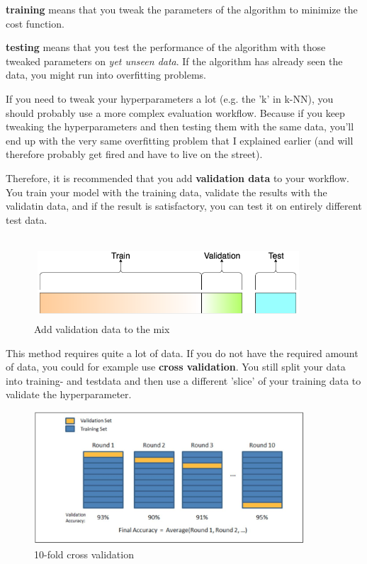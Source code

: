 \documentclass[a4paper, 11pt]{article}
\begin{document}
\textbf{training} means that you tweak the parameters of the algorithm to minimize the cost function.

\textbf{testing} means that you test the performance of the algorithm with those tweaked parameters on \textit{yet unseen data}. If the algorithm has already seen the data, you might run into overfitting problems.

\vspace{10px}

If you need to tweak your hyperparameters a lot (e.g. the 'k' in k-NN), you should probably use a more complex evaluation workflow. Because if you keep tweaking the hyperparameters and then testing them with the same data, you'll end up with the very same overfitting problem that I explained earlier (and will therefore probably get fired and have to live on the street).

\vspace{10px}

Therefore, it is recommended that you add \textbf{validation data} to your workflow. You train your model with the training data, validate the results with the validatin data, and if the result is satisfactory, you can test it on entirely different test data.

\begin{figure}[htb!]
    \centering
    \includegraphics[keepaspectratio=true,width=0.9\textwidth]{validation_data.png}
    \caption{Add validation data to the mix}
    \label{fig:validation_data}
\end{figure}

This method requires quite a lot of data. If you do not have the required amount of data, you could for example use \textbf{cross validation}. You still split your data into training- and testdata and then use a different 'slice' of your training data to validate the hyperparameter.

\begin{figure}[htb!]
    \centering
    \includegraphics[keepaspectratio=true,width=0.9\textwidth]{cross_validation.png}
    \caption{10-fold cross validation}
    \label{fig:cross_validation}
\end{figure}
\end{document}
